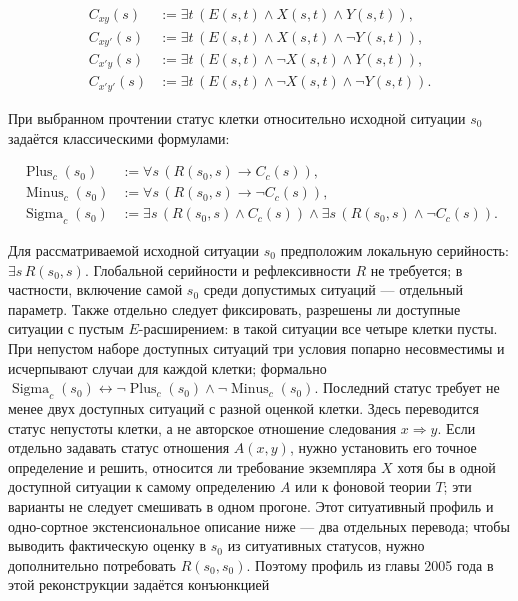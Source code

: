 \documentclass[12pt,a4paper]{article}
\begin{document}
\[
\begin{aligned}
C_{xy}(s)   &:= \exists t\,(E(s,t)\land X(s,t)\land Y(s,t)),\\
C_{xy'}(s)  &:= \exists t\,(E(s,t)\land X(s,t)\land \neg Y(s,t)),\\
C_{x'y}(s)  &:= \exists t\,(E(s,t)\land \neg X(s,t)\land Y(s,t)),\\
C_{x'y'}(s) &:= \exists t\,(E(s,t)\land \neg X(s,t)\land \neg Y(s,t)).
\end{aligned}
\]

При выбранном прочтении статус клетки относительно исходной ситуации \(s_0\) задаётся классическими формулами:

\[
\begin{aligned}
\operatorname{Plus}_c(s_0)  &:= \forall s\,(R(s_0,s)\to C_c(s)),\\
\operatorname{Minus}_c(s_0) &:= \forall s\,(R(s_0,s)\to \neg C_c(s)),\\
\operatorname{Sigma}_c(s_0) &:= \exists s\,(R(s_0,s)\land C_c(s))\land
                                  \exists s\,(R(s_0,s)\land \neg C_c(s)).
\end{aligned}
\]

Для рассматриваемой исходной ситуации \(s_0\) предположим локальную серийность: \(\exists s\,R(s_0,s)\). Глобальной серийности и рефлексивности \(R\) не требуется; в частности, включение самой \(s_0\) среди допустимых ситуаций — отдельный параметр. Также отдельно следует фиксировать, разрешены ли доступные ситуации с пустым \(E\)-расширением: в такой ситуации все четыре клетки пусты. При непустом наборе доступных ситуаций три условия попарно несовместимы и исчерпывают случаи для каждой клетки; формально \(\operatorname{Sigma}_c(s_0)\leftrightarrow\neg\operatorname{Plus}_c(s_0)\land\neg\operatorname{Minus}_c(s_0)\). Последний статус требует не менее двух доступных ситуаций с разной оценкой клетки. Здесь переводится статус непустоты клетки, а не авторское отношение следования \(x\Rightarrow y\). Если отдельно задавать статус отношения \(A(x,y)\), нужно установить его точное определение и решить, относится ли требование экземпляра \(X\) хотя бы в одной доступной ситуации к самому определению \(A\) или к фоновой теории \(T\); эти варианты не следует смешивать в одном прогоне. Этот ситуативный профиль и одно-сортное экстенсиональное описание ниже — два отдельных перевода; чтобы выводить фактическую оценку в \(s_0\) из ситуативных статусов, нужно дополнительно потребовать \(R(s_0,s_0)\). Поэтому профиль из главы 2005 года в этой реконструкции задаётся конъюнкцией
\end{document}
